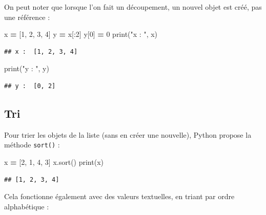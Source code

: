 \documentclass[
  12pt,
]{book}
\newenvironment{Shaded}{\begin{snugshade}}{\end{snugshade}}
\newcommand{\BuiltInTok}[1]{#1}
\newcommand{\DecValTok}[1]{\textcolor[rgb]{0.00,0.00,0.81}{#1}}
\newcommand{\NormalTok}[1]{#1}
\newcommand{\OperatorTok}[1]{\textcolor[rgb]{0.81,0.36,0.00}{\textbf{#1}}}
\newcommand{\StringTok}[1]{\textcolor[rgb]{0.31,0.60,0.02}{#1}}
\numberwithin{equation}{section}
\numberwithin{countremarque}{section}
\begin{document}
On peut noter que lorsque l'on fait un découpement, un nouvel objet est créé, pas une référence :

\begin{Shaded}
\begin{Highlighting}[]
\NormalTok{x }\OperatorTok{=}\NormalTok{ [}\DecValTok{1}\NormalTok{, }\DecValTok{2}\NormalTok{, }\DecValTok{3}\NormalTok{, }\DecValTok{4}\NormalTok{]}
\NormalTok{y }\OperatorTok{=}\NormalTok{ x[:}\DecValTok{2}\NormalTok{]}
\NormalTok{y[}\DecValTok{0}\NormalTok{] }\OperatorTok{=} \DecValTok{0}
\BuiltInTok{print}\NormalTok{(}\StringTok{"x : "}\NormalTok{, x)}
\end{Highlighting}
\end{Shaded}

\begin{lstlisting}
## x :  [1, 2, 3, 4]
\end{lstlisting}

\begin{Shaded}
\begin{Highlighting}[]
\BuiltInTok{print}\NormalTok{(}\StringTok{"y : "}\NormalTok{, y)}
\end{Highlighting}
\end{Shaded}

\begin{lstlisting}
## y :  [0, 2]
\end{lstlisting}

\subsection{Tri}\label{tri}

Pour trier les objets de la liste (sans en créer une nouvelle), Python propose la méthode \texttt{sort()} :

\begin{Shaded}
\begin{Highlighting}[]
\NormalTok{x }\OperatorTok{=}\NormalTok{ [}\DecValTok{2}\NormalTok{, }\DecValTok{1}\NormalTok{, }\DecValTok{4}\NormalTok{, }\DecValTok{3}\NormalTok{]}
\NormalTok{x.sort()}
\BuiltInTok{print}\NormalTok{(x)}
\end{Highlighting}
\end{Shaded}

\begin{lstlisting}
## [1, 2, 3, 4]
\end{lstlisting}

Cela fonctionne également avec des valeurs textuelles, en triant par ordre alphabétique :
\end{document}
